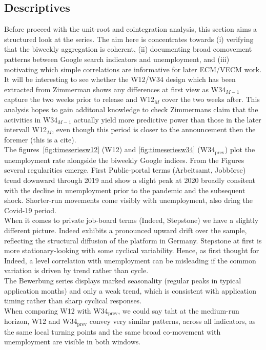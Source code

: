 \documentclass[12pt,a4paper]{article}
\begin{document}
\subsection{Descriptives}
Before proceed with the unit-root and cointegration analysis, this section aims a structured look at the series.
The aim here is concentrates towards (i) verifying that the biweekly aggregation is coherent, 
(ii) documenting broad comovement patterns between Google search indicators and unemployment, and (iii) motivating which simple correlations are informative for later ECM/VECM work.
It will be interesting to see whether the W12/W34 design which has been extracted from Zimmerman shows any differences at first view as W34$_{M-1}$capture the two weeks prior to release and W12$_M$ cover the two weeks after.
This analysis hopes to gain additonal knowledge to check Zimmermans claim that the activities in W34$_{M-1}$ actually yield more predictive power than those in the later intervall W12$_M$, even though this period is closer to the announcement then the foremer (this is a cite).\\
The figures~\ref{fig:timeseriesw12} (W12) and \ref{fig:timeseriesw34} (W34$_{\text{prev}}$) plot the unemployment rate alongside the biweekly Google indices.
From the Figures several regularities emerge. First Public-portal terms (Arbeitsamt, Jobbörse) trend downward through 2019 and show a slight peak at 2020 broadly consitent with the decline in unemployment prior to the pandemic and the subsequent shock. Shorter-run movements come visibly with unemployment, also dring the Covid-19 period.\\
When it comes to private job-board terms (Indeed, Stepstone) we have a slightly different picture. 
Indeed exhibits a pronounced upward drift over the sample, reflecting the structural diffusion of the platform in Germany.
Stepstone at first is more stationary-looking with some cyclical variability. 
Hence, as first thought for Indeed, a level correlation with unemployment can be misleading if the common variation is driven by trend rather than cycle.  \\
The Bewerbung series displays marked seasonality (regular peaks in typical application months) and only a weak trend, which is consistent with application timing rather than sharp cyclical responses.\\
When comparing W12 with W34$_{\text{prev}}$, we could say taht at the medium-run horizon, W12 and W34$_{\text{prev}}$ convey very similar patterns, across all indicators, as the same local turning points and the same broad co-movement with unemployment are visible in both windows.
\end{document}
